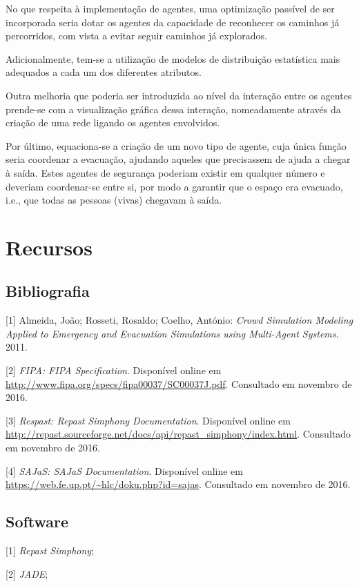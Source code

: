 \documentclass[12pt]{article}
\begin{document}
\begin{titlepage}
No que respeita à implementação de agentes, uma optimização passível de ser incorporada seria dotar os agentes da capacidade de reconhecer os caminhos já percorridos, com vista a evitar seguir caminhos já explorados. 

Adicionalmente, tem-se a utilização de modelos de distribuição estatística mais adequados a cada um dos diferentes atributos.

Outra melhoria que poderia ser introduzida ao nível da interação entre os agentes prende-se com a visualização gráfica dessa interação, nomeadamente através da criação de uma rede ligando os agentes envolvidos.

Por último, equaciona-se a criação de um novo tipo de agente, cuja única função seria coordenar a evacuação, ajudando aqueles que precisassem de ajuda a chegar à saída. Estes agentes de segurança poderiam existir em qualquer número e deveriam coordenar-se entre si, por modo a garantir que o espaço era evacuado, i.e., que todas as pessoas (vivas) chegavam à saída.



\section{Recursos}
\subsection{Bibliografia}
[1] Almeida, João; Rosseti, Rosaldo; Coelho, António: \textit{Crowd Simulation Modeling Applied to Emergency and Evacuation Simulations using Multi-Agent Systems}. 2011.

[2] \textit{FIPA: FIPA Specification}. Disponível online em \url{http://www.fipa.org/specs/fipa00037/SC00037J.pdf}. Consultado em novembro de 2016.

[3] \textit{Respast: Repast Simphony Documentation}. Disponível online em \url{http://repast.sourceforge.net/docs/api/repast_simphony/index.html}. Consultado em novembro de 2016.

[4] \textit{SAJaS: SAJaS Documentation}. Disponível online em \url{https://web.fe.up.pt/~hlc/doku.php?id=sajas}. Consultado em novembro de 2016.


\subsection{Software}
[1] \textit{Repast Simphony};

[2] \textit{JADE};


\end{titlepage}
\end{document}
